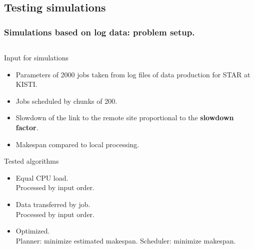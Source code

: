 \documentclass{beamer}
\begin{document}
\subsection{Testing simulations}

\begin{frame}\frametitle{Simulations based on log data: problem setup.}
\begin{columns}[c] %
    \begin{small}
\vspace{-5mm}
 		\begin{block}{Input for simulations}
		\begin{itemize}
			\item Parameters of 2000 jobs taken from log files of data production for STAR at KISTI.
			\item Jobs scheduled by chunks of 200.
			\item Slowdown of the link to the remote site proportional to the \textbf{slowdown factor}.
			\item Makespan compared to local processing.
		\end{itemize}
 	\end{block}
 		\begin{block}{Tested algorithms}
		\begin{itemize}
			\item Equal CPU load.\\ Processed by input order.
			\item Data transferred by job. \\ Processed by input order.
			\item Optimized.\\ Planner: minimize estimated makespan. Scheduler: minimize makespan.
		\end{itemize}
 	\end{block}
 	\end{small} 


\end{columns}
\end{frame}
\end{document}
